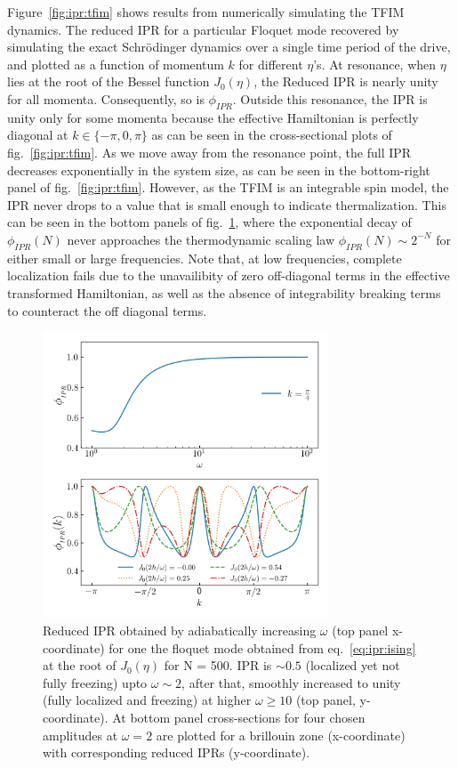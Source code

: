 \documentclass[%
reprint,
superscriptaddress,
amsmath,amssymb,
aps,
prb,
showkeys,
]{revtex4-2}
\begin{document}
Figure~\ref{fig:ipr:tfim} shows results from numerically simulating the TFIM dynamics. The reduced IPR for a particular Floquet mode recovered by simulating the exact Schr\"odinger dynamics over a single time period of the drive, and plotted as a function of momentum $k$ for different $\eta$'s. At resonance, when $\eta$ lies at the root of the Bessel function $J_0(\eta)$,  the {Reduced} IPR is {nearly} unity for all momenta. {Consequently, so is} $\phi_{IPR}$.  Outside this resonance, the IPR is unity only for some momenta because the effective Hamiltonian is perfectly diagonal at $k \in{\{-\pi, 0, \pi\}}$ as can be seen in the cross-sectional plots of fig.~\ref{fig:ipr:tfim}. As we move away from the resonance point, the full IPR decreases exponentially in the system size, as can be seen in the bottom-right panel of fig.~\ref{fig:ipr:tfim}.
However, as the TFIM is an integrable spin model, the IPR never drops to a value that is small enough to indicate thermalization. This can be seen in the bottom panels of fig.~\ref{fig:ipr:isinglowfrk}{, where the exponential decay of} $\phi_{IPR}(N)$ {never approaches the thermodynamic scaling law $\phi_{IPR}(N)\sim 2^{-N}$ for either small or large frequencies. Note that, a}t low frequencies, {complete localization} fails due to the unavailibity of zero off-diagonal terms in the  effective transformed Hamiltonian, as well as the absence of integrability breaking terms to counteract the off diagonal terms. 
\begin{figure}[t!]
	\centering
	\includegraphics[width = 8.5cm]{ising_exact_lowfr_ipr.jpeg}
	\caption{Reduced IPR obtained by adiabatically increasing $\omega$ (top panel x-coordinate) for one the floquet mode obtained from eq.~\ref{eq:ipr:ising} at the root of $J_0(\eta)$ for N = 500. IPR is $\sim 0.5$ (localized yet not fully freezing) upto $\omega \sim 2$, after that, smoothly increased to unity (fully localized and freezing) at higher $\omega \geq 10$ (top panel, y-coordinate). At bottom panel cross-sections for four chosen amplitudes at $\omega =2$ are plotted for a brillouin zone (x-coordinate) with corresponding reduced IPRs (y-coordinate).}
	\label{fig:ipr:isinglowfrk}
\end{figure}
\end{document}
